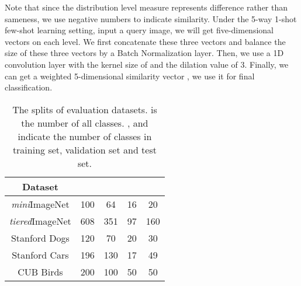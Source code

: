 \documentclass[10pt,twocolumn,letterpaper]{article}
\begin{document}
Note that since the distribution level measure represents difference rather than sameness, we use negative numbers to indicate similarity. Under the 5-way 1-shot few-shot learning setting, input a query image, we will get five-dimensional vectors on each level. We first concatenate these three vectors and balance the size of these three vectors by a Batch Normalization layer. 
Then, we use a 1D convolution layer with the kernel size of  and the dilation value of 3. Finally, we can get a weighted 5-dimensional similarity vector , we use it for final classification. 

\begin{table}[t]
	\centering
	\begin{tabular}{ccccc}
		\toprule
		\textbf{Dataset} &\textbf{}&\textbf{}&\textbf{}&\textbf{}
		\\
		\midrule
		\emph{mini}ImageNet&100&64&16&20\\
		\emph{tiered}ImageNet&608&351&97&160\\
		Stanford Dogs&120&70&20&30\\		
		Stanford Cars&196&130&17&49\\
		CUB Birds&200&100&50&50\\
		\bottomrule
	\end{tabular}	
	\caption{The splits of evaluation datasets.  is the number of all classes. ,  and  indicate the number of classes in training set, validation set and test set.}
\end{table}
\end{document}
